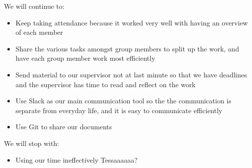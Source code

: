 \noindent We will continue to:
\begin{itemize}
\item Keep taking attendance because it worked very well with having an overview of each member
\item Share the various tasks amongst group members to split up the work, and have each group member work most efficiently
\item Send material to our supervisor not at last minute so that we have deadlines and the supervisor has time to read and reflect on the work
\item Use Slack as our main communication tool so the the communication is separate from everyday life, and it is easy to communicate efficiently
\item Use Git to share our documents
\end{itemize}

\noindent We will stop with:
\begin{itemize}
\item Using our time ineffectively Tessaaaaaa?
\end{itemize}

